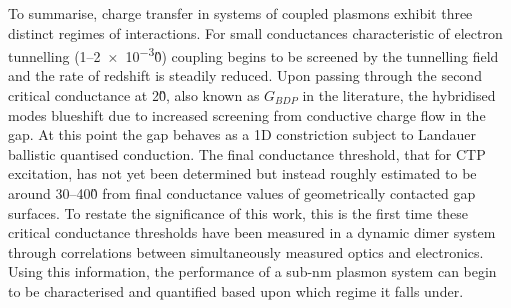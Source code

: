 \documentclass[a4paper]{article}
\begin{document}
To summarise, charge transfer in systems of coupled plasmons exhibit three distinct regimes of interactions. For small conductances characteristic of electron tunnelling (1--\num{2e-3}\G0) coupling begins to be screened by the tunnelling field and the rate of redshift is steadily reduced. Upon passing through the second critical conductance at 2\G0, also known as $G_{BDP}$ in the literature, the hybridised modes blueshift due to increased screening from conductive charge flow in the gap. At this point the gap behaves as a 1D constriction subject to Landauer ballistic quantised conduction. The final conductance threshold, that for CTP excitation, has not yet been determined but instead roughly estimated to be around 30--40\G0 from final conductance values of geometrically contacted gap surfaces. To restate the significance of this work, this is the first time these critical conductance thresholds have been measured in a dynamic dimer system through correlations between simultaneously measured optics and electronics. Using this information, the performance of a sub-nm plasmon system can begin to be characterised and quantified based upon which regime it falls under.

\end{document}
